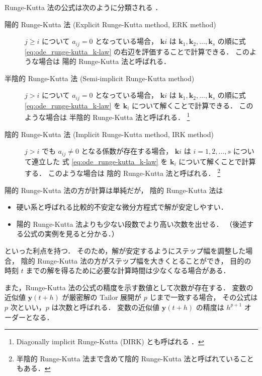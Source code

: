 Runge-Kutta 法の公式は次のように分類される \cite{Mitsui1993}．

\begin{description}
    \item[陽的 Runge-Kutta 法 (Explicit Runge-Kutta method, ERK method)]
        $j \ge i$ について $a_{ij} = 0$ となっている場合，
        $\bm{k}i$ は $\bm{k}_1, \bm{k}_2, \ldots, \bm{k}_s$
        の順に式 \eqref{eq:ode_runge-kutta_k-law} の右辺を評価することで計算できる．
        このような場合は
        陽的 Runge-Kutta 法と呼ばれる．
    \item[半陰的 Runge-Kutta 法 (Semi-implicit Runge-Kutta method)]
        $j > i$ について $a_{ij} = 0$ となっている場合，
        $\bm{k}i$ は $\bm{k}_1, \bm{k}_2, \ldots, \bm{k}_s$
        の順に式 \eqref{eq:ode_runge-kutta_k-law} を $\bm{k}_i$ について解くことで計算できる．
        このような場合は
        半陰的 Runge-Kutta 法と呼ばれる．
        \footnote{Diagonally implicit Runge-Kutta (DIRK) とも呼ばれる \cite{Hairer1991}．}
    \item[陰的 Runge-Kutta 法 (Implicit Runge-Kutta method, IRK method)]
        $j > i$ でも $a_{ij} \neq 0$ となる係数が存在する場合，
        $\bm{k}i$ は $i = 1, 2, \ldots, s$ について連立した
        式 \eqref{eq:ode_runge-kutta_k-law} を $\bm{k}_i$ について解くことで計算する．
        このような場合は
        陰的 Runge-Kutta 法と呼ばれる．
        \footnote{半陰的 Runge-Kutta 法まで含めて陰的 Runge-Kutta 法と呼ばれていることもある．}
\end{description}

陽的 Runge-Kutta 法の方が計算は単純だが，
陰的 Runge-Kutta 法は

\begin{itemize}
    \item {} 硬い系と呼ばれる比較的不安定な微分方程式で解が安定しやすい．
    \item 陽的 Runge-Kutta 法よりも少ない段数でより高い次数を出せる．
          （後述する公式の実例を見ると分かる．）
\end{itemize}

といった利点を持つ．
そのため，解が安定するようにステップ幅を調整した場合，
陰的 Runge-Kutta 法の方がステップ幅を大きくとることができ，
目的の時刻 $t$ までの解を得るために必要な計算時間は少なくなる場合がある．

また，Runge-Kutta 法の公式の精度を示す数値として次数が存在する．
変数の近似値 $\bm{y}(t + h)$ が厳密解の Tailor 展開が $p$ じまで一致する場合，
その公式は $p$ 次といい，$p$ は次数と呼ばれる．
変数の近似値 $\bm{y}(t + h)$ の精度は $h^{p+1}$ オーダーとなる．

